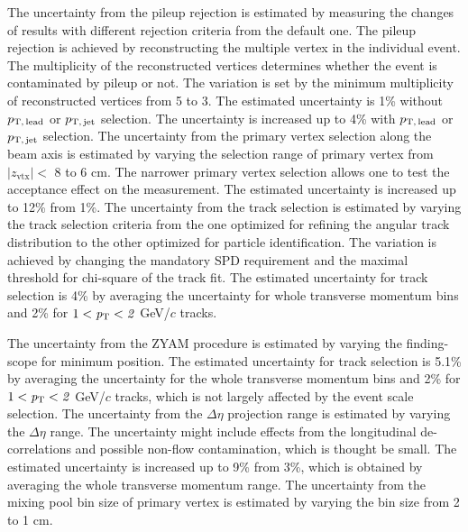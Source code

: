 The uncertainty from the pileup rejection is estimated by measuring the changes of results with different rejection criteria from the default one. The pileup rejection is achieved by reconstructing the multiple vertex in the individual event. The multiplicity of the reconstructed vertices determines whether the event is contaminated by pileup or not. The variation is set by the minimum multiplicity of reconstructed vertices from 5 to 3. 
The estimated uncertainty is 1\% without $p_\mathrm{T,\,lead}$ or $p_\mathrm{T,\,jet}$ selection. The uncertainty is increased up to 4\% with $p_\mathrm{T,\,lead}$ or $p_\mathrm{T,\,jet}$ selection. The uncertainty from the primary vertex selection along the beam axis is estimated by varying the selection range of primary vertex from $|z_\mathrm{vtx}|<$ 8 to 6 cm. The narrower primary vertex selection allows one to test the acceptance effect on the measurement. The estimated uncertainty is increased up to 12\% from 1\%.
The uncertainty from the track selection is estimated by varying the track selection criteria from the one optimized for refining the angular track distribution to the other optimized for particle identification. The variation is achieved by changing the mandatory SPD requirement and the maximal threshold for chi-square of the track fit.
The estimated uncertainty for track selection is 4\% by averaging the uncertainty for whole transverse momentum bins and 2\% for $1<\it{p}_{\rm{T}}<2$ GeV/$c$ tracks.

The uncertainty from the ZYAM procedure is estimated by varying the finding-scope for minimum position. The estimated uncertainty for track selection is 5.1\% by averaging the uncertainty for the whole transverse momentum bins and 2\% for $1<\it{p}_{\rm{T}}<2$ GeV/$c$ tracks, which is not largely affected by the event scale selection. The uncertainty from the $\Delta\eta$ projection range is estimated by varying the $\Delta\eta$ range. The uncertainty might include effects from the longitudinal de-correlations and possible non-flow contamination, which is thought be small. The estimated uncertainty is increased up to 9\% from 3\%, which is obtained by averaging the whole transverse momentum range.
The uncertainty from the mixing pool bin size of primary vertex is estimated by varying the bin size from 2 to 1 cm. 




